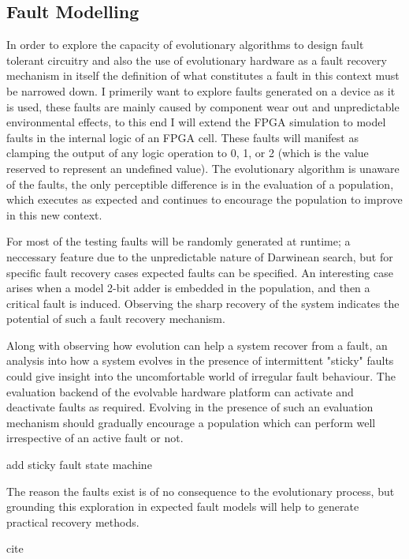 \subsection{Fault Modelling}
In order to explore the capacity of evolutionary algorithms to design fault
tolerant circuitry and also the use of evolutionary hardware as a fault
recovery mechanism in itself the definition of what constitutes a fault in
this context must be narrowed down. I primerily want to explore faults
generated on a device as it is used, these faults are mainly caused by
component wear out and unpredictable environmental effects, to
this end I will extend the FPGA simulation to model
faults in the internal logic of an FPGA cell. These faults will manifest as clamping
the output of any logic operation to 0, 1, or 2 (which is the value reserved to represent
an undefined value). The evolutionary algorithm is unaware of the
faults, the only perceptible difference is in the evaluation of a population,
which executes as expected and continues to encourage the population to improve in this
new context.

For most of the testing faults will be randomly generated at runtime; a neccessary
feature due to the unpredictable nature of Darwinean search, but for specific
fault recovery cases expected faults can be specified. An interesting case arises when
a model 2-bit adder is embedded in the population, and then a critical fault is
induced. Observing the sharp recovery of the system indicates the potential of
such a fault recovery mechanism.

Along with observing how evolution can help a system recover from a fault, an
analysis into how a system evolves in the presence of intermittent "sticky"
faults could give insight into the uncomfortable world of irregular fault behaviour.
The evaluation backend of the evolvable hardware platform can activate and
deactivate faults as required. Evolving in the presence of such an evaluation
mechanism should gradually encourage a population which can perform well
irrespective of an active fault or not.

\todo add sticky fault state machine

The reason the faults exist is of no consequence to the evolutionary process,
but grounding this exploration in expected fault models will help to generate
practical recovery methods.

\todo cite

